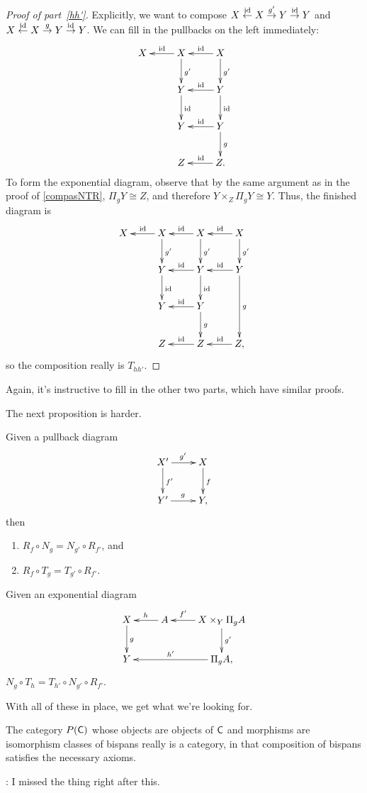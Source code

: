 \begin{proof}[Proof of part~\eqref{hh'}]
Explicitly, we want to compose $X\stackrel{\mathrm{id}}\gets X\stackrel{g'}\to Y\stackrel{\mathrm{id}}\to Y$ and $X\stackrel{\mathrm{id}}\gets
X\stackrel{g}\to Y\stackrel{\mathrm{id}}\to Y$. We can fill in the pullbacks on the left immediately:
\[\xymatrix{
	X & X\ar[l]_\id\ar[d]^{g'} & X\ar[l]_\id\ar[d]^{g'}\\
	& Y\ar[d]^\id & Y\ar[l]_\id\ar[d]^\id\\
	& Y & Y\ar[l]_\id\ar[d]^g\\
	& Z & Z.\ar[l]_\id
}\]
To form the exponential diagram, observe that by the same argument as in the proof of \cref{compasNTR}, $\Pi_g
Y\cong Z$, and therefore $Y\times_Z\Pi_g Y\cong Y$. Thus, the finished diagram is
\[\xymatrix{
	X & X\ar[l]_\id\ar[d]^{g'} & X\ar[l]_\id\ar[d]^{g'} & X\ar[l]_\id\ar[d]^{g'}\\
	& Y\ar[d]^\id & Y\ar[l]_\id\ar[d]^\id & Y\ar[l]_\id\ar[dd]^g\\
	& Y & Y\ar[l]_\id\ar[d]^g\\
	& Z & Z\ar[l]_\id & Z\ar[l]_\id,
}\]
so the composition really is $T_{hh'}$.
\end{proof}
Again, it's instructive to fill in the other two parts, which have similar proofs.

The next proposition is harder.
\begin{prop}
Given a pullback diagram
\[\xymatrix{
	X'\ar[r]^{g'}\ar[d]^{f'} & X\ar[d]^f\\
	Y'\ar[r]^g & Y,
}\]
then
\begin{enumerate}
	\item $R_f\circ N_g = N_{g'}\circ R_{f'}$, and
	\item $R_f\circ T_g = T_{g'}\circ R_{f'}$.
\end{enumerate}
\end{prop}
\begin{prop}
Given an exponential diagram
\[\xymatrix{
	X\ar[d]^g & A\ar[l]_h & X\times_Y \Pi_g A\ar[l]_-{f'}\ar[d]^{g'}\\
	Y && \Pi_g A,\ar[ll]_-{h'}
}\]
$N_g\circ T_h = T_{h'}\circ N_{g'}\circ R_{f'}$.
\end{prop}
With all of these in place, we get what we're looking for.
\begin{cor}
The category $P(\mathsf C)$ whose objects are objects of $\mathsf C$ and morphisms are isomorphism classes of bispans really is
a category, in that composition of bispans satisfies the necessary axioms.
\end{cor}
\TODO: I missed the thing right after this.

